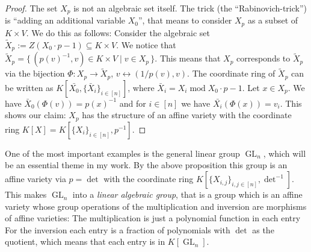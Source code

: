 \begin{proof}
  The set $X_p$ is not an algebraic set itself.
  The trick (the ``Rabinovich-trick'') is ``adding an additional variable $X_0$'', that means to consider $X_p$ as a subset of $K \times V$.
  We do this as follows:
  Consider the algebraic set $\tilde{X}_p := Z \left( X_0 \cdot p -1 \right) \subseteq K \times V$.
  We notice that $\tilde{X}_p = \{\, (p(v)^{-1},v) \in K \times V \mid v \in X_p \,\}$.
  This means that $X_p$ corresponds to $\tilde{X}_p$ via the bijection $\Phi \colon X_p \longrightarrow \tilde{X}_p$, $ v \leftrightarrow (1/p(v),v)$.
  The coordinate ring of $\tilde{X}_p$ can be written as $K[\bar{X_0}, \{\bar{X}_i\}_{i \in [n]}]$, where $\bar{X}_i = X_i \operatorname{mod} X_0 \cdot p -1$.
  Let $x \in X_p$.
  We have $\bar{X}_0 (\Phi(v)) = p(x)^{-1}$ and for $ i \in [n] $ we have $\bar{X_i}(\Phi(x)) = v_i$.
  This shows our claim: $X_p$ has the structure of an affine variety with the coordinate ring $K[X] = K[\{X_i\}_{i \in [n]}, p^{-1}]$.
\end{proof}

\begin{example}
  One of the most important examples is the general linear group $\operatorname{GL}_n$, which will be an essential theme in my work.
  By the above proposition this group is an affine variety via $p = \operatorname{det}$ with the coordinate ring $K[\{X_{i,j}\}_{i,j \in [n]}, \operatorname{det}^{-1}]$.
  This makes $\operatorname{GL}_n$ into a \textit{linear algebraic group}, that is a group which is an affine variety whose group operations of the multiplication and inversion are morphisms of affine varieties:
  The multiplication is just a polynomial function in each entry
  For the inversion each entry is a fraction of polynomials with $\operatorname{det}$ as the quotient, which means that each entry is in $K[\operatorname{GL}_n]$.
\end{example}

